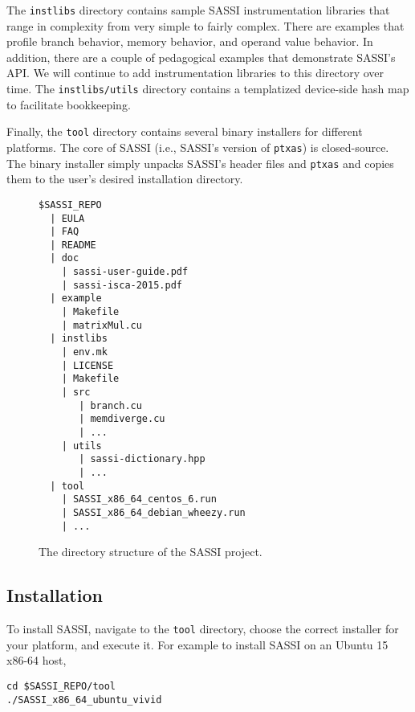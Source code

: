 The \texttt{instlibs} directory contains sample SASSI instrumentation
libraries that range in complexity from very simple to fairly complex.
There are examples that profile branch behavior, memory behavior, and
operand value behavior.  In addition, there are a couple of
pedagogical examples that demonstrate SASSI's API.  We will continue
to add instrumentation libraries to this directory over time.  The
\texttt{instlibs/utils} directory contains a templatized device-side
hash map to facilitate bookkeeping.

Finally, the \texttt{tool} directory contains several binary
installers for different platforms.  The core of SASSI (i.e., SASSI's
version of \texttt{ptxas}) is closed-source.  The binary installer
simply unpacks SASSI's header files and \texttt{ptxas} and copies them
to the user's desired installation directory.

\begin{figure*}
\center
\begin{verbatim}
$SASSI_REPO
  | EULA
  | FAQ
  | README
  | doc
    | sassi-user-guide.pdf
    | sassi-isca-2015.pdf
  | example
    | Makefile
    | matrixMul.cu 
  | instlibs
    | env.mk
    | LICENSE
    | Makefile
    | src
       | branch.cu
       | memdiverge.cu
       | ...
    | utils
       | sassi-dictionary.hpp
       | ...
  | tool
    | SASSI_x86_64_centos_6.run
    | SASSI_x86_64_debian_wheezy.run
    | ...
\end{verbatim}
\caption{The directory structure of the SASSI project.}
\label{fig:structure}
\end{figure*}

\subsection{Installation}

To install SASSI, navigate to the \texttt{tool} directory, choose the
correct installer for your platform, and execute it.  For example to
install SASSI on an Ubuntu 15 x86-64 host,

\begin{lstlisting}[style=BashInputStyle]
cd $SASSI_REPO/tool
./SASSI_x86_64_ubuntu_vivid
\end{lstlisting}

